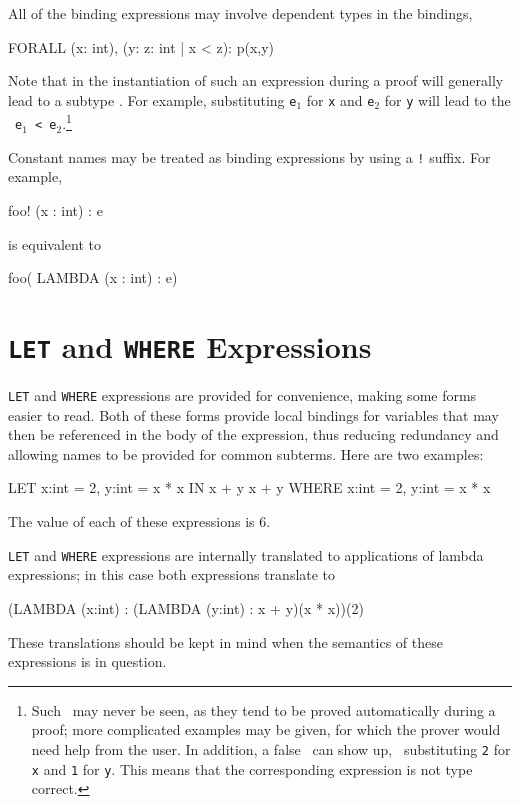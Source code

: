 All of the binding expressions may involve dependent
types in the bindings, \eg
\begin{pvsex}
  FORALL (x: int), (y: \setb{}z: int | x < z\sete): p(x,y)
\end{pvsex}
%
Note that in the instantiation of such an expression during a proof will
generally lead to a subtype \tcc.  For example, substituting \texttt{e$_1$} for
\texttt{x} and \texttt{e$_2$} for \texttt{y} will lead to the \tcc\ \texttt{e$_1$ <
e$_2$}.\footnote{Such \tccs\ may never be seen, as they tend to be
proved automatically during a proof; more complicated examples may be
given, for which the prover would need help from the user.  In addition,
a false \tcc\ can show up, \eg\ substituting \texttt{2} for \texttt{x} and
\texttt{1} for \texttt{y}.  This means that the corresponding expression is
not type correct.}

Constant names may be treated as binding expressions by using a
\texttt{!}  suffix.  For example,
\begin{pvsex}
foo! (x : int) : e
\end{pvsex}
is equivalent to
\begin{pvsex}
foo( LAMBDA (x : int) : e)
\end{pvsex}

\section{\texttt{LET} and \texttt{WHERE} Expressions}

\texttt{LET} and \texttt{WHERE} expressions are provided for convenience,
making some forms easier to read.  Both of these forms provide local
bindings for variables that may then be referenced in the body of the
expression, thus reducing redundancy and allowing names to be provided for common subterms.
Here are two examples:
\begin{pvsex}
  LET x:int = 2, y:int = x * x IN x + y
  x + y WHERE x:int = 2, y:int = x * x
\end{pvsex}
%
The value of each of these expressions is 6.

\texttt{LET} and \texttt{WHERE} expressions are internally translated to
applications of lambda expressions; in this case both expressions
translate to
\begin{pvsex}
  (LAMBDA (x:int) : (LAMBDA (y:int) : x + y)(x * x))(2)
\end{pvsex}
%
These translations should be kept in mind when the semantics of these
expressions is in question.

